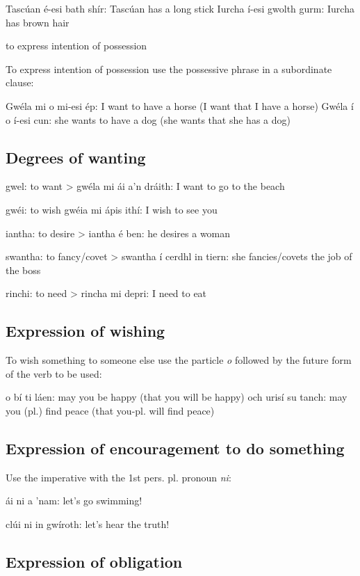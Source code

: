 Tasc\'{u}an \'{e}-esi bath sh\'{i}r: Tasc\'{u}an has a long stick
Iurcha \'{i}-esi gwolth gurm: Iurcha has brown hair

    to express intention of possession

To express intention of possession use the possessive phrase in a subordinate clause:

Gw\'{e}la mi o mi-esi \'{e}p: I want to have a horse (I want that I have a horse)
Gw\'{e}la \'{i} o \'{i}-esi cun: she wants to have a dog (she wants that she has a dog)

\subsection{Degrees of wanting}

gwel: to want
> gw\'{e}la mi \'{a}i a'n dr\'{a}ith: I want to go to the beach

gw\'{e}i: to wish
gw\'{e}ia mi \'{a}pis ith\'{i}: I wish to see you

iantha: to desire
> iantha \'{e} ben: he desires a woman

swantha: to fancy/covet
> swantha \'{i} cerdhl in tiern: she fancies/covets the job of the boss

rinchi: to need
> rincha mi depri: I need to eat

\subsection{Expression of wishing}

To wish something to someone else use the particle \textit{o} followed by the future form of the verb to be used:

o b\'{i} ti l\'{a}en: may you be happy (that you will be happy)
och uris\'{i} su tanch: may you (pl.) find peace (that you-pl. will find peace)
 
\subsection{Expression of encouragement to do something}

Use the imperative with the 1st pers. pl. pronoun \textit{ni}:
 
\'{a}i ni a 'nam: let's go swimming!

cl\'{u}i ni in gw\'{i}roth: let's hear the truth!

\subsection{Expression of obligation}

